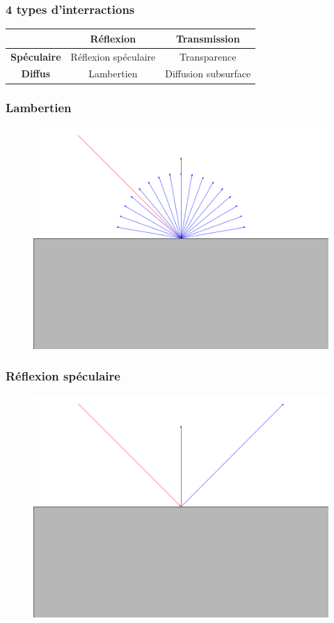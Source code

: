 \documentclass[handout]{beamer}
\begin{document}
\begin{frame}

    \frametitle{4 types d'interractions}

    \begin{tabular}{ | c | c | c | }
        \hline
         & \bfseries Réflexion & \bfseries Transmission \\
        \hline
        \bfseries Spéculaire & Réflexion spéculaire & Transparence \\
        \hline
        \bfseries Diffus & Lambertien & Diffusion subsurface \\
        \hline
    \end{tabular}
    
\end{frame}

\begin{frame}
    \frametitle{Lambertien}
    \begin{figure}
        \includegraphics[scale=0.3]{Lambertian.png}
    \end{figure}
\end{frame}

\begin{frame}
    \frametitle{Réflexion spéculaire}
    \begin{figure}
        \includegraphics[scale=0.3]{Metal.png}
    \end{figure}
\end{frame}
\end{document}
